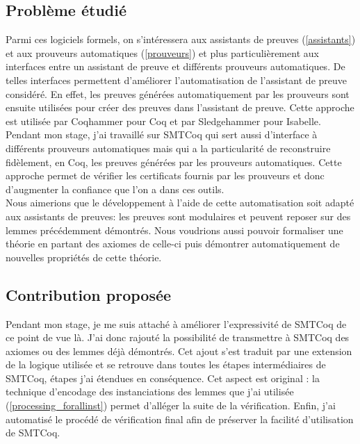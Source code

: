 \documentclass[11pt]{article}
\begin{document}
\subsection{Problème étudié}

Parmi ces logiciels formels, on s'intéressera aux assistants de preuves (\ref{assistants}) et aux prouveurs automatiques (\ref{prouveurs}) et plus particulièrement aux interfaces entre un assistant de preuve et différents prouveurs automatiques.  De telles interfaces permettent d'améliorer l'automatisation de l'assistant de preuve considéré. En effet, les preuves générées automatiquement par les prouveurs sont ensuite utilisées pour créer des preuves dans l'assistant de preuve. Cette approche est utilisée par Coqhammer \cite{coqhammer} pour Coq et par Sledgehammer \cite{sledgehammer_manual} pour Isabelle. \\
Pendant mon stage, j'ai travaillé sur SMTCoq qui sert aussi d'interface à différents prouveurs automatiques mais qui a la particularité de reconstruire fidèlement, en Coq, les preuves générées par les prouveurs automatiques. Cette approche permet de vérifier les certificats fournis par les prouveurs et donc d'augmenter la confiance que l'on a dans ces outils.\\

Nous aimerions que le développement à l'aide de cette automatisation soit adapté aux assistants de preuves: les preuves sont modulaires et peuvent reposer sur des lemmes précédemment démontrés. Nous voudrions aussi pouvoir formaliser une théorie en partant des axiomes de celle-ci puis démontrer automatiquement de nouvelles propriétés de cette théorie.

\subsection{Contribution proposée}

Pendant mon stage, je me suis attaché à améliorer l'expressivité de SMTCoq de ce point de vue là. J'ai donc rajouté la possibilité de transmettre à SMTCoq des axiomes ou des lemmes déjà démontrés. Cet ajout s'est traduit par une extension de la logique utilisée et se retrouve dans toutes les étapes intermédiaires de SMTCoq, étapes j'ai étendues en conséquence.  Cet aspect est original : la technique d'encodage des instanciations des lemmes que j'ai utilisée (\ref{processing_forallinst}) permet d'alléger la suite de la vérification. Enfin, j'ai automatisé le procédé de vérification final afin de préserver la facilité d'utilisation de SMTCoq.
\end{document}
